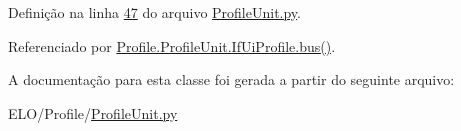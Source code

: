 Definição na linha \hyperlink{ProfileUnit_8py_source_l00047}{47} do arquivo \hyperlink{ProfileUnit_8py_source}{Profile\-Unit.\-py}.



Referenciado por \hyperlink{classProfile_1_1ProfileUnit_1_1IfUiProfile_ac3d0a7a780dcf729b9f3cf1fff243a78}{Profile.\-Profile\-Unit.\-If\-Ui\-Profile.\-bus()}.



A documentação para esta classe foi gerada a partir do seguinte arquivo\-:\begin{DoxyCompactItemize}
\item 
E\-L\-O/\-Profile/\hyperlink{ProfileUnit_8py}{Profile\-Unit.\-py}\end{DoxyCompactItemize}
